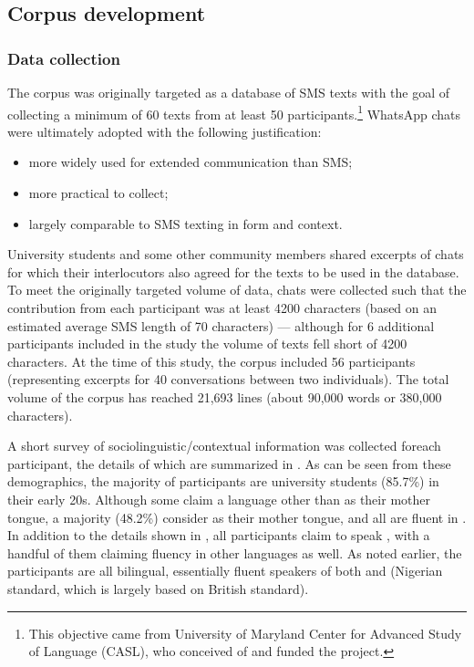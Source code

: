 \documentclass[output=paper
,newtxmath
,modfonts
,nonflat]{langsci/langscibook}
\begin{document}
\subsection{Corpus development}
\subsubsection{Data collection}

The corpus was originally targeted as a database of SMS texts with the goal of collecting a minimum of 60 texts from at least 50 participants.\footnote{This objective came from University of Maryland Center for Advanced Study of Language (CASL), who conceived of and funded the project.} WhatsApp chats were ultimately adopted with the following justification:

\begin{itemize}
\item more widely used for extended communication than SMS; 

\item more practical to collect;

\item largely comparable to SMS texting in form and context.
\end{itemize}

University students and some other community members shared excerpts of chats for which their interlocutors also agreed for the texts to be used in the database. To meet the originally targeted volume of data, chats were collected such that the contribution from each participant was at least 4200 characters (based on an estimated average SMS length of 70 characters) — although for 6 additional participants included in the study the volume of texts fell short of 4200 characters. At the time of this study, the corpus included 56 participants (representing excerpts for 40 conversations between two individuals). The total volume of the corpus has reached 21,693 lines (about 90,000 words or 380,000 characters).

A short survey of sociolinguistic\slash contextual information was collected for\linebreak each participant, the details of which are summarized in . As can be seen from these demographics, the majority of participants are university students (85.7\%) in their early 20s. Although some claim a language other than  as their mother tongue, a majority (48.2\%) consider  as their mother tongue, and all are fluent in . In addition to the details shown in , all participants claim to speak , with a handful of them claiming fluency in other languages as well. As noted earlier, the participants are all bilingual, essentially fluent speakers of both  and  (Nigerian standard, which is largely based on British standard).
\end{document}
